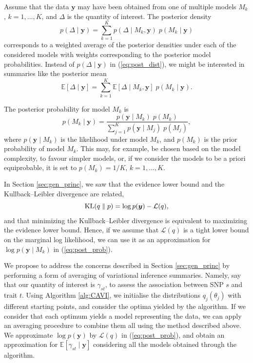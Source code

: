 \documentclass[a4paper, 11pt]{report}
\numberwithin{equation}{chapter}
\DeclareMathOperator*{\KL}{{\rm KL}}
\begin{document}
Assume that the data $\boldsymbol{y}$ may have been obtained from one of multiple models $M_k$, $k= 1,\ldots,K$, and $\Delta$ is the quantity of interest. The posterior density
\begin{equation}
p(\Delta \mid \boldsymbol{y}) = \sum_{k=1}^K p(\Delta \mid M_k,\boldsymbol{y}) \; p(M_k \mid \boldsymbol{y})
\label{eq:post_dist}
\end{equation}
corresponds to a weighted average of the posterior densities under each of the considered models with weights corresponding to the posterior model probabilities. Instead of $p(\Delta \mid \boldsymbol{y})$ in (\ref{eq:post_dist}), we might be interested in summaries like the posterior mean
\begin{equation*}
\mathbb{E}\left[\Delta \mid \boldsymbol{y}\right] = \sum_{k=1}^K\mathbb{E}\left[\Delta \mid M_k, \boldsymbol{y}\right]\;p(M_k \mid \boldsymbol{y}).
\end{equation*}

The posterior probability for model $M_k$ is
\begin{equation}
p(M_k \mid \boldsymbol{y}) = \frac{p(\boldsymbol{y} \mid M_k)\; p(M_k)}{\sum_{j=1}^K p(\boldsymbol{y} \mid M_j)\; p(M_j)},
\label{eq:post_prob}
\end{equation}
where $p(\boldsymbol{y} \mid M_k)$ is the likelihood under model $M_k$, and $p(M_k)$ is the prior probability of model $M_k$. This may, for example, be chosen based on the model complexity, to favour simpler models, or, if we consider the models to be a priori equiprobable, it is set to $p(M_k) = 1/K$, $k = 1,\ldots,K$.  

In Section \ref{sec:gen_princ}, we saw that the evidence lower bound and the Kullback--Leibler divergence are related, 
\begin{equation*}
\KL(q\parallel p) = \log p (\boldsymbol{y}) - \mathcal{L}(q),
\end{equation*}
and that minimizing the Kullback--Leibler divergence is equivalent to maximizing the evidence lower bound. Hence, if we assume that $\mathcal{L}(q)$ is a tight lower bound on the marginal log likelihood, we can use it as an approximation for $\log p(\boldsymbol{y}\mid M_k)$ in (\ref{eq:post_prob}).

We propose to address the concerns described in Section \ref{sec:gen_princ} by performing a form of averaging of variational inference summaries. Namely, say that our quantity of interest is $\gamma_{st}$, to assess the association between SNP $s$ and trait $t$. Using Algorithm \ref{alg:CAVI}, we initialise the distributions $q_j(\theta_j)$ with different starting points, and consider the optima yielded by the algorithm. If we consider that each optimum yields a model representing the data, we can apply an averaging procedure to combine them all using the method described above. We approximate $\log p(\boldsymbol{y})$ by $\mathcal{L}(q)$ in (\ref{eq:post_prob}), and obtain an approximation for $\mathbb{E}\left[\gamma_{st}\mid \boldsymbol{y}\right]$ considering all the models obtained through the algorithm.
\end{document}
